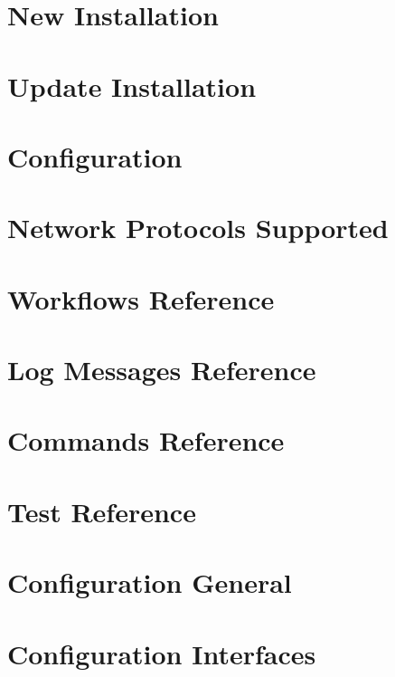 \documentclass[
	oneside,
	openany,
	a4paper,
	headings=optiontoheadandtoc
	]{book}
\begin{document}
\chapter{New Installation}


\chapter{Update Installation}


\chapter{Configuration}


\chapter{Network Protocols Supported}


\chapter{Workflows Reference}


\chapter{Log Messages Reference}


\chapter{Commands Reference}


\chapter{Test Reference}


\appendix

\chapter{Configuration General}
 

\chapter{Configuration Interfaces}
 
\end{document}
